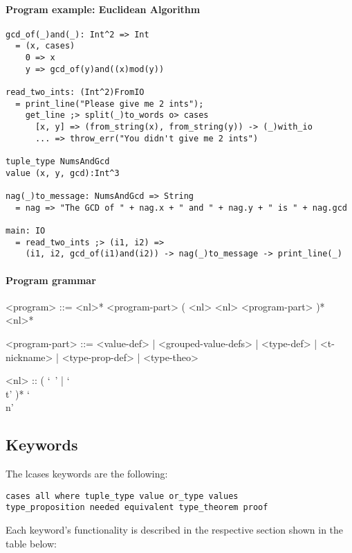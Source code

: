 \documentclass{article}
\begin{document}
\paragraph{Program example: Euclidean Algorithm}
\begin{verbatim}
gcd_of(_)and(_): Int^2 => Int
  = (x, cases)
    0 => x
    y => gcd_of(y)and((x)mod(y))

read_two_ints: (Int^2)FromIO
  = print_line("Please give me 2 ints");
    get_line ;> split(_)to_words o> cases
      [x, y] => (from_string(x), from_string(y)) -> (_)with_io
      ... => throw_err("You didn't give me 2 ints")

tuple_type NumsAndGcd
value (x, y, gcd):Int^3

nag(_)to_message: NumsAndGcd => String
  = nag => "The GCD of " + nag.x + " and " + nag.y + " is " + nag.gcd

main: IO
  = read_two_ints ;> (i1, i2) =>
    (i1, i2, gcd_of(i1)and(i2)) -> nag(_)to_message -> print_line(_)
\end{verbatim}

\paragraph{Program grammar}
\begin{grammar}
<program> ::=
<nl>* <program-part> ( <nl> <nl> <program-part> )* <nl>*

<program-part> ::=
<value-def> | <grouped-value-defs> | <type-def> | <t-nickname> |
<type-prop-def> | <type-theo>

<nl> :: ( `\ ' | `\\t' )* `\\n'
\end{grammar}

\newpage
\subsection{Keywords}

The lcases keywords are the following:
\begin{verbatim}
cases all where tuple_type value or_type values
type_proposition needed equivalent type_theorem proof
\end{verbatim}
Each keyword's functionality is described in the respective section shown in
the table below:
\end{document}
